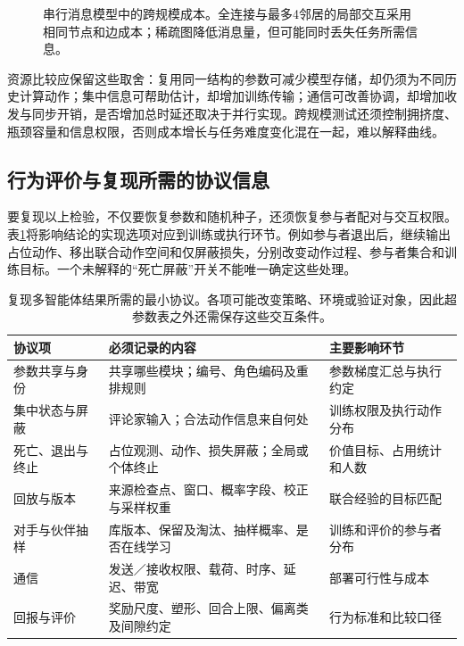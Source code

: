\begin{figure}[htbp]
 \centering
 
 \caption{串行消息模型中的跨规模成本。全连接与最多4邻居的局部交互采用相同节点和边成本；稀疏图降低消息量，但可能同时丢失任务所需信息。}
 \label{fig:rl-multi-agent-scaling}
\end{figure}

资源比较应保留这些取舍：复用同一结构的参数可减少模型存储，却仍须为不同历史计算动作；集中信息可帮助估计，却增加训练传输；通信可改善协调，却增加收发与同步开销，是否增加总时延还取决于并行实现。跨规模测试还须控制拥挤度、瓶颈容量和信息权限，否则成本增长与任务难度变化混在一起，难以解释曲线。

\subsection{行为评价与复现所需的协议信息}
\label{sec:rl-multi-agent-protocol}

要复现以上检验，不仅要恢复参数和随机种子，还须恢复参与者配对与交互权限。表\ref{tab:rl-multi-agent-protocol}将影响结论的实现选项对应到训练或执行环节。例如参与者退出后，继续输出占位动作、移出联合动作空间和仅屏蔽损失，分别改变动作过程、参与者集合和训练目标。一个未解释的“死亡屏蔽”开关不能唯一确定这些处理。

\begin{table}[htbp]
 \centering
 \begin{tabularx}{\linewidth}{@{}l >{\raggedright\arraybackslash}X >{\raggedright\arraybackslash}X@{}}
 \toprule
 协议项 & 必须记录的内容 & 主要影响环节\\
 \midrule
 参数共享与身份 & 共享哪些模块；编号、角色编码及重排规则 & 参数梯度汇总与执行约定\\
 集中状态与屏蔽 & 评论家输入；合法动作信息来自何处 & 训练权限及执行动作分布\\
 死亡、退出与终止 & 占位观测、动作、损失屏蔽；全局或个体终止 & 价值目标、占用统计和人数\\
 回放与版本 & 来源检查点、窗口、概率字段、校正与采样权重 & 联合经验的目标匹配\\
 对手与伙伴抽样 & 库版本、保留及淘汰、抽样概率、是否在线学习 & 训练和评价的参与者分布\\
 通信 & 发送／接收权限、载荷、时序、延迟、带宽 & 部署可行性与成本\\
 回报与评价 & 奖励尺度、塑形、回合上限、偏离类及间隙约定 & 行为标准和比较口径\\
 \bottomrule
 \end{tabularx}
 \caption{复现多智能体结果所需的最小协议。各项可能改变策略、环境或验证对象，因此超参数表之外还需保存这些交互条件。}
 \label{tab:rl-multi-agent-protocol}
\end{table}

